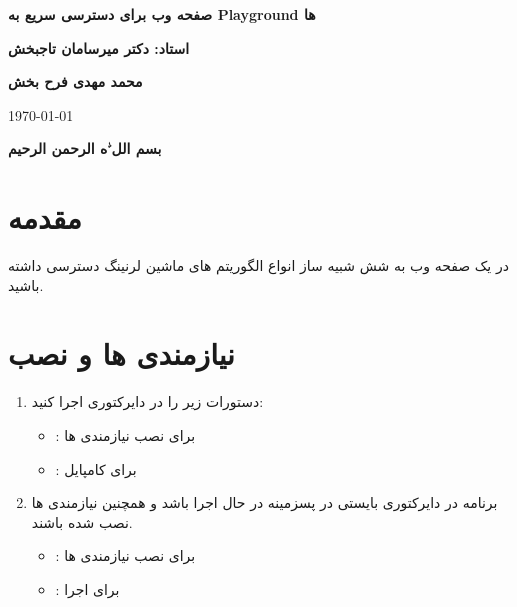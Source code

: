 \documentclass{report}
\begin{document}
	\begin{titlepage}
		
		\centering
		\vspace*{2cm}
		\textbf{\LARGE صفحه وب برای دسترسی سریع به Playground ها}
		\vspace{1cm}
		
		
		
		\vfill
		\textbf{استاد: دکتر میرسامان تاجبخش}
		
		
		\textbf{محمد مهدی فرح بخش}
		 
		\vspace{1cm}
		\today
	\end{titlepage}
	
	\begin{center}
		\textbf{
		بسم اللﱣه الرحمن الرحیم
		}
	\end{center}
	
	\section{مقدمه}
در یک صفحه وب به شش شبیه ساز انواع الگوریتم های ماشین لرنینگ دسترسی داشته باشید.
	
	\section{نیازمندی ها و نصب}
	\begin{enumerate}
		\item 
		دستورات زیر را در دایرکتوری
		اجرا کنید:
		\begin{itemize}
			\item {} : 
			برای نصب نیازمندی ها 
			\item {} : 
			برای کامپایل
		\end{itemize}
		
		\item 
		برنامه
		در دایرکتوری 
		بایستی در پسزمینه در حال اجرا باشد و همچنین نیازمندی ها نصب شده باشند.
		\begin{itemize}
			\item {} : 
			برای نصب نیازمندی ها 
			\item {} : 
			برای اجرا
		\end{itemize}
		
	\end{enumerate}
	
\end{document}
